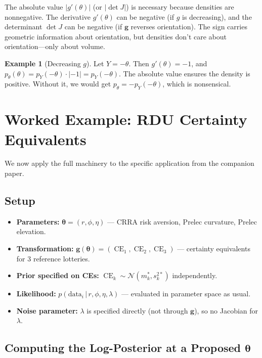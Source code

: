 \documentclass[11pt,a4paper]{article}
\theoremstyle{definition}
\newtheorem{example}[theorem]{Example}
\newcommand{\Normal}{\mathcal{N}}
\newcommand{\given}{\,|\,}
\newcommand{\btheta}{\boldsymbol{\theta}}
\DeclareMathOperator{\CE}{CE}
\begin{document}
The absolute value $|g'(\theta)|$ (or $|\!\det J|$) is necessary because
densities are nonneg\-ative. The derivative $g'(\theta)$ can be negative (if $g$
is decreasing), and the determinant $\det J$ can be negative (if $\mathbf{g}$
reverses orientation). The sign carries geometric information about orientation,
but densities don't care about orientation---only about volume.

\begin{example}[Decreasing $g$]
Let $Y = -\theta$. Then $g'(\theta) = -1$, and
$p_\theta(\theta) = p_Y(-\theta) \cdot |-1| = p_Y(-\theta)$. The absolute
value ensures the density is positive. Without it, we would get
$p_\theta = -p_Y(-\theta)$, which is nonsensical.
\end{example}


\section{Worked Example: RDU Certainty Equivalents}
\label{sec:rdu}

We now apply the full machinery to the specific application from the companion
paper.

\subsection{Setup}

\begin{itemize}
    \item \textbf{Parameters:} $\btheta = (r, \phi, \eta)$ --- CRRA risk
    aversion, Prelec curvature, Prelec elevation.
    \item \textbf{Transformation:} $\mathbf{g}(\btheta) = (\CE_1, \CE_2, \CE_3)$
    --- certainty equivalents for 3 reference lotteries.
    \item \textbf{Prior specified on CEs:}
    $\CE_k \sim \Normal(m_k^*, s_k^{2*})$ independently.
    \item \textbf{Likelihood:} $p(\text{data}_i \given r, \phi, \eta, \lambda)$
    --- evaluated in parameter space as usual.
    \item \textbf{Noise parameter:} $\lambda$ is specified directly (not through
    $\mathbf{g}$), so no Jacobian for $\lambda$.
\end{itemize}

\subsection{Computing the Log-Posterior at a Proposed \texorpdfstring{$\btheta$}{theta}}
\end{document}
